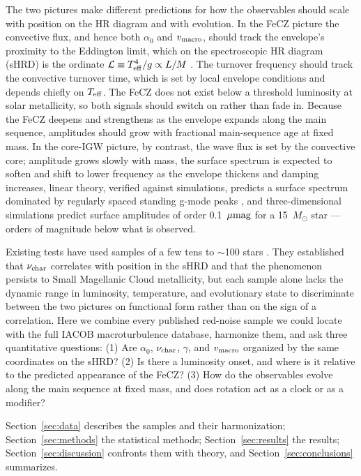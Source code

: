 \documentclass[twocolumn]{aastex631}
\newcommand{\vmac}{v_{\rm macro}}
\newcommand{\teff}{T_{\rm eff}}
\newcommand{\nuchar}{\nu_{\rm char}}
\renewcommand{\ell}{\mathcal{L}}
\newcommand{\umag}{\mu{\rm mag}}
\begin{document}
The two pictures make different predictions for how the observables should scale with position on the HR diagram and with evolution. In the FeCZ picture the convective flux, and hence both $\alpha_0$ and $\vmac$, should track the envelope's proximity to the Eddington limit, which on the spectroscopic HR diagram (sHRD) is the ordinate $\ell\equiv\teff^4/g\propto L/M$ \citep{cantiello2021}. The turnover frequency should track the convective turnover time, which is set by local envelope conditions and depends chiefly on $\teff$. The FeCZ does not exist below a threshold luminosity at solar metallicity, so both signals should switch on rather than fade in. Because the FeCZ deepens and strengthens as the envelope expands along the main sequence, amplitudes should grow with fractional main-sequence age at fixed mass. In the core-IGW picture, by contrast, the wave flux is set by the convective core; amplitude grows slowly with mass, the surface spectrum is expected to soften and shift to lower frequency as the envelope thickens and damping increases, linear theory, verified against simulations, predicts a surface spectrum dominated by regularly spaced standing g-mode peaks \citep{lecoanet2019,lecoanet2021}, and three-dimensional simulations predict surface amplitudes of order 0.1~$\umag$ for a 15~$M_\odot$ star \citep{anders2023}---orders of magnitude below what is observed.

Existing tests have used samples of a few tens to $\sim$100 stars \citep{bowman2020,bowman2022,bowman2024,ma2024,shen2024}. They established that $\nuchar$ correlates with position in the sHRD and that the phenomenon persists to Small Magellanic Cloud metallicity, but each sample alone lacks the dynamic range in luminosity, temperature, and evolutionary state to discriminate between the two pictures on functional form rather than on the sign of a correlation. Here we combine every published red-noise sample we could locate with the full IACOB macroturbulence database, harmonize them, and ask three quantitative questions: (1) Are $\alpha_0$, $\nuchar$, $\gamma$, and $\vmac$ organized by the same coordinates on the sHRD? (2) Is there a luminosity onset, and where is it relative to the predicted appearance of the FeCZ? (3) How do the observables evolve along the main sequence at fixed mass, and does rotation act as a clock or as a modifier?

Section~\ref{sec:data} describes the samples and their harmonization; Section~\ref{sec:methods} the statistical methods; Section~\ref{sec:results} the results; Section~\ref{sec:discussion} confronts them with theory, and Section~\ref{sec:conclusions} summarizes.
\end{document}
